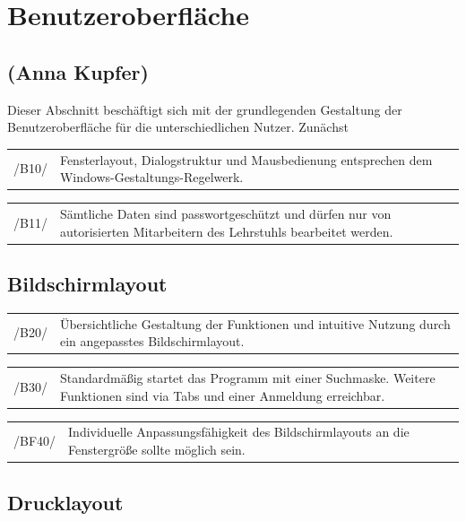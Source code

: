 \section{Benutzeroberfläche}
\label{sec:Benutzeroberfläche}

\subsection*{(Anna Kupfer)}

Dieser Abschnitt beschäftigt sich mit der grundlegenden Gestaltung der Benutzeroberfläche für die unterschiedlichen Nutzer. Zunächst


\begin{tabular}{p{1.5cm}p{14.5cm}}
 /B10/	& Fensterlayout, Dialogstruktur und Mausbedienung entsprechen dem Windows-Gestaltungs-Regelwerk. \\[0.25cm]	 
\end{tabular}

\begin{tabular}{p{1.5cm}p{14.5cm}}
 /B11/	& Sämtliche Daten sind passwortgeschützt und dürfen nur von autorisierten Mitarbeitern des Lehrstuhls bearbeitet werden. \\[0.25cm]	 
\end{tabular}


\subsection{Bildschirmlayout}

\begin{tabular}{p{1.5cm}p{14.5cm}}
 /B20/	& Übersichtliche Gestaltung der Funktionen und intuitive Nutzung durch ein angepasstes Bildschirmlayout. \\[0.25cm]	 
\end{tabular}

\begin{tabular}{p{1.5cm}p{14.5cm}}
 /B30/	& Standardmäßig startet das Programm mit einer Suchmaske. Weitere Funktionen sind via Tabs und einer Anmeldung erreichbar. \\[0.25cm]	 
\end{tabular}

\begin{tabular}{p{1.5cm}p{14.5cm}}
 /BF40/	& Individuelle Anpassungsfähigkeit des Bildschirmlayouts an die Fenstergröße sollte möglich sein. \\[0.25cm]	 
\end{tabular}

\subsection{Drucklayout}

